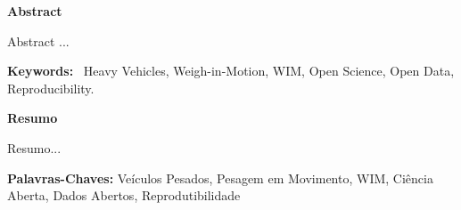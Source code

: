 \documentclass[a4paper]{article}
\newcommand\textstyletablecaptionCar[1]{\foreignlanguage{english}{\textbf{#1}}}
\begin{document}
\bigskip


\bigskip

{\bfseries
Abstract}

{

Abstract ...

}


\bigskip


{
\textstyletablecaptionCar{Keywords:} \ Heavy
Vehicles, Weigh-in-Motion, WIM, Open Science, Open Data, Reproducibility.}


\bigskip

{\bfseries
\foreignlanguage{portuguese}{Resumo}}

{
\foreignlanguage{portuguese}{
Resumo...
}}


\bigskip

{
\textstyletablecaptionCar{\foreignlanguage{portuguese}{Palavras-Chaves:}}\foreignlanguage{portuguese}{
Veículos Pesados, Pesagem em Movimento, WIM, Ciência Aberta, Dados Abertos, Reprodutibilidade}}
\end{document}
